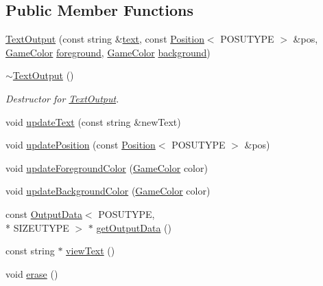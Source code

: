 \subsection*{Public Member Functions}
\begin{DoxyCompactItemize}
\item 
\hyperlink{class_text_output_abac1dd11f3ca8dc1ed87f07c17000924}{Text\-Output} (const string \&\hyperlink{class_text_output_aa63e4c0936ed44ad8658f9567acd437b}{text}, const \hyperlink{struct_position}{Position}$<$ P\-O\-S\-U\-T\-Y\-P\-E $>$ \&pos, \hyperlink{struct_game_color}{Game\-Color} \hyperlink{class_text_output_a969669fc87e0828685b6b20c4bb79616}{foreground}, \hyperlink{struct_game_color}{Game\-Color} \hyperlink{class_text_output_a1d58e4651de9d729bdc19f143b2bb042}{background})
\item 
\hyperlink{class_text_output_a8fffd270710bf5d13430696091491064}{$\sim$\-Text\-Output} ()
\begin{DoxyCompactList}\small\item\em Destructor for \hyperlink{class_text_output}{Text\-Output}. \end{DoxyCompactList}\item 
void \hyperlink{class_text_output_a9981707e972ac76a7bb7adb65201a84a}{update\-Text} (const string \&new\-Text)
\item 
void \hyperlink{class_text_output_ae028755399b3afc882a98da908759d0f}{update\-Position} (const \hyperlink{struct_position}{Position}$<$ P\-O\-S\-U\-T\-Y\-P\-E $>$ \&pos)
\item 
void \hyperlink{class_text_output_a6477f07208204b1c058ba6fa6b0e5cc6}{update\-Foreground\-Color} (\hyperlink{struct_game_color}{Game\-Color} color)
\item 
void \hyperlink{class_text_output_a46c108e633d09a102788e600b7a6d370}{update\-Background\-Color} (\hyperlink{struct_game_color}{Game\-Color} color)
\item 
const \hyperlink{struct_output_data}{Output\-Data}$<$ P\-O\-S\-U\-T\-Y\-P\-E, \\*
S\-I\-Z\-E\-U\-T\-Y\-P\-E $>$ $\ast$ \hyperlink{class_text_output_ae0f04c5f70ce6e372f7859daedbf39ee}{get\-Output\-Data} ()
\item 
const string $\ast$ \hyperlink{class_text_output_a811bcb3bc1d278ad3716bf768af2ca9d}{view\-Text} ()
\item 
void \hyperlink{class_text_output_aa7a22a6b6c0a323524ac4c956d54034c}{erase} ()
\end{DoxyCompactItemize}
